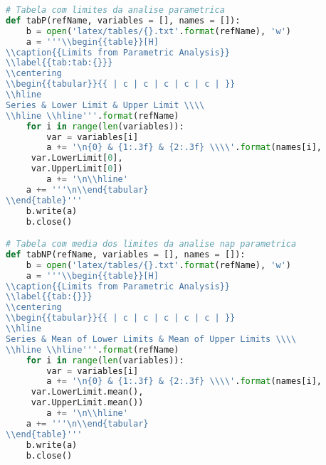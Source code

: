 \begin{lstlisting}[language=Python]
# Tabela com limites da analise parametrica
def tabP(refName, variables = [], names = []):
    b = open('latex/tables/{}.txt'.format(refName), 'w')
    a = '''\\begin{{table}}[H]
\\caption{{Limits from Parametric Analysis}}
\\label{{tab:tab:{}}}
\\centering
\\begin{{tabular}}{{ | c | c | c | c | c | }}
\\hline
Series & Lower Limit & Upper Limit \\\\
\\hline \\hline'''.format(refName)
    for i in range(len(variables)):
        var = variables[i]
        a += '\n{0} & {1:.3f} & {2:.3f} \\\\'.format(names[i],
     var.LowerLimit[0],
     var.UpperLimit[0])
        a += '\n\\hline'
    a += '''\n\\end{tabular}
\\end{table}'''
    b.write(a)
    b.close()

# Tabela com media dos limites da analise nap parametrica
def tabNP(refName, variables = [], names = []):
    b = open('latex/tables/{}.txt'.format(refName), 'w')
    a = '''\\begin{{table}}[H]
\\caption{{Limits from Parametric Analysis}}
\\label{{tab:{}}}
\\centering
\\begin{{tabular}}{{ | c | c | c | c | c | }}
\\hline
Series & Mean of Lower Limits & Mean of Upper Limits \\\\
\\hline \\hline'''.format(refName)
    for i in range(len(variables)):
        var = variables[i]
        a += '\n{0} & {1:.3f} & {2:.3f} \\\\'.format(names[i],
     var.LowerLimit.mean(),
     var.UpperLimit.mean())
        a += '\n\\hline'
    a += '''\n\\end{tabular}
\\end{table}'''
    b.write(a)
    b.close()


\end{lstlisting}
